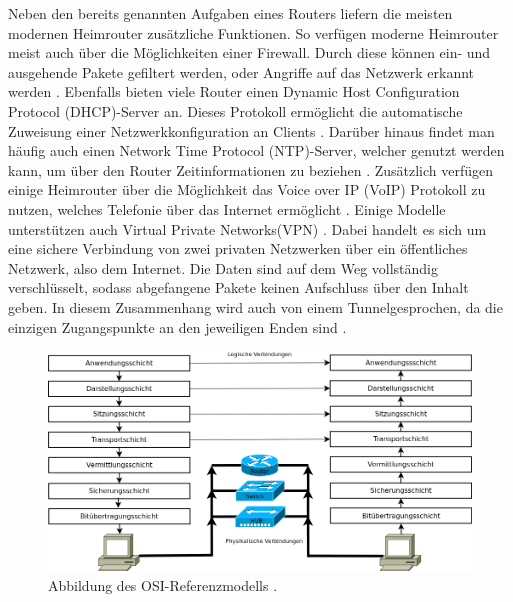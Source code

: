 \documentclass[a4paper]{book}
\begin{document}
\begin{large}
\begin{onehalfspace}
\indent Neben den bereits genannten Aufgaben eines Routers liefern die meisten modernen Heimrouter zusätzliche Funktionen. So verfügen moderne Heimrouter meist auch über die Möglichkeiten einer Firewall. Durch diese können ein- und ausgehende Pakete gefiltert werden, oder Angriffe auf das Netzwerk erkannt werden \cite[p.~588]{Schemberg.2016}. Ebenfalls bieten viele Router einen \glqq Dynamic Host Configuration Protocol (DHCP)\grqq -Server an. Dieses Protokoll ermöglicht die automatische Zuweisung einer Netzwerkkonfiguration an Clients \cite[p.~222]{Fischer.2011}. Darüber hinaus findet man häufig auch einen \glqq Network Time Protocol (NTP)\grqq -Server, welcher genutzt werden kann, um über den Router Zeitinformationen zu beziehen \cite[p.~577]{Fischer.2011}. Zusätzlich verfügen einige Heimrouter über die Möglichkeit das \glqq Voice over IP (VoIP)\grqq{} Protokoll zu nutzen, welches Telefonie über das Internet ermöglicht \cite[p.~911]{Fischer.2011}. Einige Modelle unterstützen auch \glqq Virtual Private Networks\grqq{}(VPN) . Dabei handelt es sich um \mbox eine sichere Verbindung von zwei privaten Netzwerken über ein öffentliches Netzwerk, \mbox also dem Internet. Die Daten sind auf dem Weg vollständig verschlüsselt, sodass abgefangene Pakete keinen Aufschluss über den Inhalt geben. In diesem Zusammenhang wird auch von einem \glqq Tunnel\grqq gesprochen, da die einzigen Zugangspunkte an den jeweiligen Enden sind \cite[p.~50]{Lowe.2018}.

\begin{figure}[ht]
\begin{center}
\includegraphics[scale=0.35]{images/OSI} 
\caption{Abbildung des OSI-Referenzmodells \cite{Wiki.2011}.}
\label{fig:OSI}
\end{center}
\end{figure}	

\end{onehalfspace}



\end{large}
\end{document}
